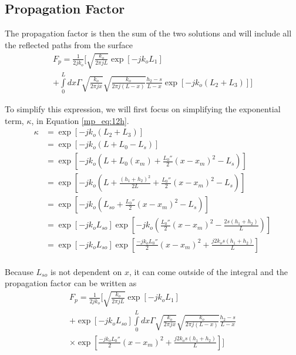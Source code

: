 \subsection{Propagation Factor}
The propagation factor is then the sum of the two solutions and will include all the reflected paths from the surface
\begin{equation}
\begin{gathered}
F_p= \frac{1}{2jk_o}\Biggl[\sqrt{\frac{k_o}{2\pi jL}}\exp\left[-jk_oL_1 \right]\\+ \int\limits_{0}^{L}dx\Gamma \sqrt{\frac{k_o}{2\pi jx}}\sqrt{\frac{k_o}{2\pi j (L-x)}}\frac{h_2-s}{L-x}\exp\left[-jk_o\left( L_2 + L_3\right) \right]\Biggr]
\label{mp_eq:12h}
\end{gathered}
\end{equation}
\renewcommand{\baselinestretch}{2} \small\normalsize

To simplify this expression, we will first focus on simplifying the exponential term, $\kappa$, in Equation \ref{mp_eq:12h}.
\begin{equation}
\begin{aligned}
\kappa&= \exp\left[-jk_o\left( L_2 + L_3\right) \right] \\
&= \exp\left[-jk_o\left( L+L_0-L_s\right) \right]\\
&= \exp\left[-jk_o\left( L+L_0(x_m) + \frac{L_0''}{2}(x-x_m)^2-L_s\right) \right]\\
&= \exp\left[-jk_o\left( L+\frac{(h_1+h_2)^2}{2L} + \frac{L_0''}{2}(x-x_m)^2-L_s\right)\right]\\
&=\exp\left[-jk_o\left(L_{so}+\frac{L_0''}{2}(x-x_m)^2-L_s\right)\right]\\
&=\exp\left[-jk_oL_{so}\right]\exp\left[-jk_o\left(\frac{L_0''}{2}(x-x_m)^2-\frac{2s(h_1+h_2)}{L}\right)\right]\\
&=\exp\left[-jk_oL_{so}\right]\exp\left[\frac{-jk_oL_0''}{2}(x-x_m)^2+\frac{j2k_os(h_1+h_2)}{L}\right]\\
\label{mp_eq:12i}
\end{aligned}
\end{equation}
\renewcommand{\baselinestretch}{2} \small\normalsize

Because $L_{so}$ is not dependent on $x$, it can come outside of the integral and the propagation factor can be written as
\begin{equation}
\begin{gathered}
F_p= \frac{1}{2jk_o}\Biggl[\sqrt{\frac{k_o}{2\pi jL}}\exp\left[-jk_oL_1 \right]\\+ \exp\left[-jk_oL_{so}\right]\int\limits_{0}^{L}dx\Gamma \sqrt{\frac{k_o}{2\pi jx}}\sqrt{\frac{k_o}{2\pi j (L-x)}}\frac{h_2-s}{L-x}\\ \times\exp\left[\frac{-jk_oL_0''}{2}(x-x_m)^2+\frac{j2k_os(h_1+h_2)}{L}\right]\Biggr]
\label{mp_eq:21}
\end{gathered}
\end{equation}
\renewcommand{\baselinestretch}{2} \small\normalsize

